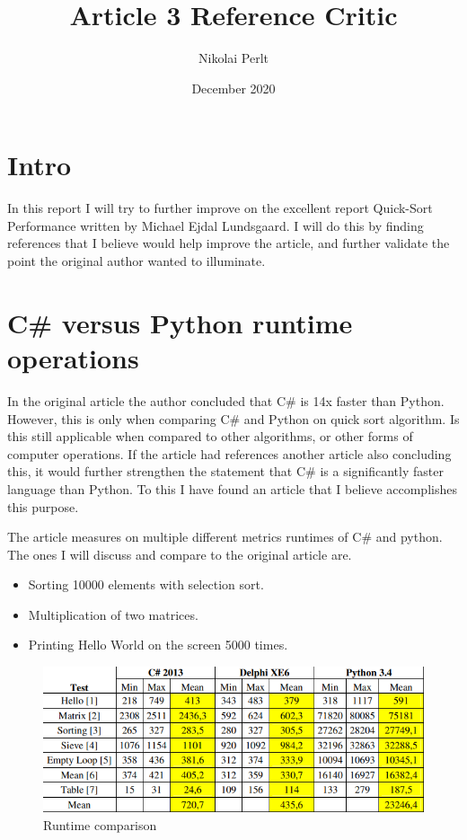 \documentclass{article}
\title{Article 3 Reference Critic}
\author{Nikolai Perlt}
\date{December 2020}
\begin{document}
  
\maketitle
\section*{Intro}
In this report I will try to further improve on the excellent report Quick-Sort Performance written by Michael Ejdal Lundsgaard\cite{pythonVsCSQuickSort}. I will do this by finding references that I believe would help improve the article, and further validate the point the original author wanted to illuminate.  

\section*{C\# versus Python runtime operations}
In the original article the author concluded that C\# is 14x faster than Python. However, this is only when comparing C\# and Python on quick sort algorithm. Is this still applicable when compared to other algorithms, or other forms of computer operations. If the article had references another article also concluding this, it would further strengthen the statement that C\# is a significantly faster language than Python. To this I have found an article that I believe accomplishes this purpose\cite{karaci2015performance}.  

The article measures on multiple different metrics runtimes of C\# and python. The ones I will discuss and compare to the original article are.

\begin{itemize}
  \item Sorting 10000 elements with selection sort.
  \item Multiplication of two matrices.
  \item Printing Hello World on the screen 5000 times.  
\end{itemize}

\begin{figure}
  \caption{Runtime comparison}
  \label{fig:runtimeTable}
  \includegraphics[width=\textwidth]{runtimeTable.png}
\end{figure}
\end{document}
